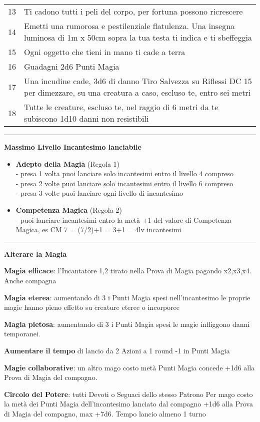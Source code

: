 \documentclass[a4paper,12 pt,openany]{book}
\newcommand{\riga}{\rule{\textwidth}{0.4pt}}
\begin{document}
\begin{textblock*}{13.5cm}
\begin{tabularx}{0.95\textwidth}{lX}
13 & Ti cadono tutti i peli del corpo, per fortuna possono ricrescere\\
14 & Emetti una rumorosa e pestilenziale flatulenza. Una insegna luminosa di 1m x 50cm sopra la tua testa ti indica e ti sbeffeggia\\
15 & Ogni oggetto che tieni in mano ti cade a terra\\
16 & Guadagni 2d6 Punti Magia\\
17 & Una incudine cade, 3d6 di danno Tiro Salvezza su Riflessi DC 15 per dimezzare, su una creatura a caso, escluso te, entro sei metri\\
18 & Tutte le creature, escluso te, nel raggio di 6 metri da te subiscono 1d10 danni non resistibili
\end{tabularx}

\riga

\textbf{Massimo Livello Incantesimo lanciabile}

\begin{itemize}
	\item
	\textbf{Adepto della Magia} (Regola 1) \\
	- presa 1 volta puoi lanciare solo incantesimi entro il livello 4 compreso\\
	- presa 2 volte puoi lanciare solo incantesimi entro il livello 6 compreso\\
	- presa 3 volte puoi lanciare ogni livello di incantesimo

	\item
	\textbf{Competenza Magica} (Regola 2)\\
	- puoi lanciare incantesimi entro la metà +1 del valore di Competenza Magica, es CM 7 = (7/2)+1 = 3+1 = 4lv incantesimi

\end{itemize}

\riga

\textbf{Alterare la Magia}

\textbf{Magia efficace}: l'Incantatore 1,2 tirato nella Prova di Magia pagando x2,x3,x4. Anche compagna

\textbf{Magia eterea}: aumentando di 3 i Punti Magia spesi nell'incantesimo le proprie magie hanno pieno effetto su creature eteree o incorporee

\textbf{Magia pietosa}: aumentando di 3 i Punti Magia spesi le magie infliggono danni temporanei.

\textbf{Aumentare il tempo} di lancio da 2 Azioni a 1 round -1 in Punti Magia

\textbf{Magie collaborative}: un altro mago costo metà Punti Magia concede +1d6 alla Prova di Magia del compagno.

\textbf{Circolo del Potere}: tutti Devoti o Seguaci dello stesso Patrono
Per mago costo la metà dei Punti Magia dell'incantesimo lanciato dal compagno +1d6 alla Prova di Magia del compagno, max +7d6. Tempo lancio almeno 1 turno
\end{textblock*}

~\newpage
\end{document}
